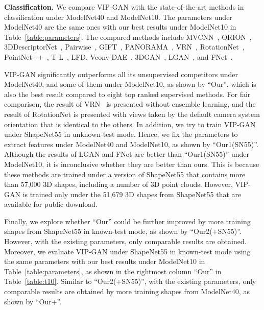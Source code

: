 \documentclass[letterpaper]{article} \usepackage{aaai19}  \usepackage{times}  \usepackage{helvet}  \usepackage{courier}  \usepackage{url}  \usepackage{graphicx}
\begin{document}
\noindent\textbf{Classification. }We compare VIP-GAN with the state-of-the-art methods in classification under ModelNet40 and ModelNet10. The parameters under ModelNet40 are the same ones with our best results under ModelNet10 in Table~\ref{table:parameters}. The compared methods include MVCNN~\cite{su15mvcnn}, ORION~\cite{SZB17a}, 3DDescriptorNet~\cite{JianwenCVPR2018}, Pairwise~\cite{JohnsLD16}, GIFT~\cite{tmmbs2016}, PANORAMA~\cite{Sfikas17}, VRN~\cite{Brocknips2016}, RotationNet~\cite{AsakoCVPR2018}, PointNet++~\cite{nipspoint17}, T-L~\cite{Girdhar16}, LFD, Vconv-DAE~\cite{Sharma16}, 3DGAN~\cite{WuNIPS2016}, LGAN~\cite{PanosCVPR2018ICML}, and FNet~\cite{YaoqingCVPR2018}.


VIP-GAN significantly outperforms all its unsupervised competitors under ModelNet40, and some of them under ModelNet10, as shown by ``Our'', which is also the best result compared to eight top ranked supervised methods. For fair comparison, the result of VRN~\cite{Brocknips2016} is presented without ensemble learning, and the result of RotationNet\cite{AsakoCVPR2018} is presented with views taken by the default camera system orientation that is identical to the others. In addition, we try to train VIP-GAN under ShapeNet55 in unknown-test mode. Hence, we fix the parameters to extract features under ModelNet40 and ModelNet10, as shown by ``Our1(SN55)''. Although the results of LGAN\cite{PanosCVPR2018ICML} and FNet\cite{YaoqingCVPR2018} are better than ``Our1(SN55)'' under ModelNet10, it is inconclusive whether they are better than ours. This is because these methods are trained under a version of ShapeNet55 that contains more than 57,000 3D shapes, including a number of 3D point clouds. However, VIP-GAN is trained only under the 51,679 3D shapes from ShapeNet55 that are available for public download.

Finally, we explore whether ``Our'' could be further improved by more training shapes from ShapeNet55 in known-test mode, as shown by ``Our2(+SN55)''. However, with the existing parameters, only comparable results are obtained. Moreover, we evaluate VIP-GAN under ShapeNet55 in known-test mode using the same parameters with our best results under ModelNet10 in Table~\ref{table:parameters}, as shown in the rightmost column ``Our'' in Table~\ref{table:t10}. Similar to ``Our2(+SN55)'',  with the existing parameters, only comparable results are obtained by more training shapes from ModelNet40, as shown by ``Our+''.
\end{document}
